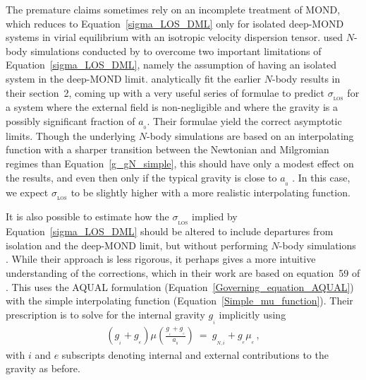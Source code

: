 \documentclass[fleqn,usenatbib,useAMS,onecolumn]{mnras} %
\begin{document}
The premature claims sometimes rely on an incomplete treatment of MOND, which reduces to Equation~\ref{sigma_LOS_DML} only for isolated deep-MOND systems in virial equilibrium with an isotropic velocity dispersion tensor. \citet{Haghi_2019_DF2} used $N$-body simulations conducted by \citet{Haghi_2009} to overcome two important limitations of Equation~\ref{sigma_LOS_DML}, namely the assumption of having an isolated system in the deep-MOND limit. \citet{Haghi_2019_DF2} analytically fit the earlier $N$-body results in their section~2, coming up with a very useful series of formulae to predict $\sigma_{_\text{LOS}}$ for a system where the external field is non-negligible and where the gravity is a possibly significant fraction of $a_{_0}$. Their formulae yield the correct asymptotic limits. Though the underlying $N$-body simulations are based on an interpolating function with a sharper transition between the Newtonian and Milgromian regimes than Equation~\ref{g_gN_simple}, this should have only a modest effect on the results, and even then only if the typical gravity is close to $a_{_0}$ \citep{Haghi_2009}. In this case, we expect $\sigma_{_\text{LOS}}$ to be slightly higher with a more realistic interpolating function.

It is also possible to estimate how the $\sigma_{_\text{LOS}}$ implied by Equation~\ref{sigma_LOS_DML} should be altered to include departures from isolation and the deep-MOND limit, but without performing $N$-body simulations \citep{Famaey_2018}. While their approach is less rigorous, it perhaps gives a more intuitive understanding of the corrections, which in their work are based on equation~59 of \citet{Famaey_McGaugh_2012}. This uses the AQUAL formulation (Equation~\ref{Governing_equation_AQUAL}) with the simple interpolating function (Equation~\ref{Simple_mu_function}). Their prescription is to solve for the internal gravity $g_{_i}$ implicitly using
\begin{eqnarray}
	\left( g_{_i} + g_{_e} \right) \mu \left( \frac{g_{_i} + g_{_e}}{a_{_0}} \right) ~=~ g_{_{N,i}} + g_{_e} \mu_{_e} \, ,
	\label{Famaey_ansatz}
\end{eqnarray}
with $i$ and $e$ subscripts denoting internal and external contributions to the gravity as before.
\end{document}

